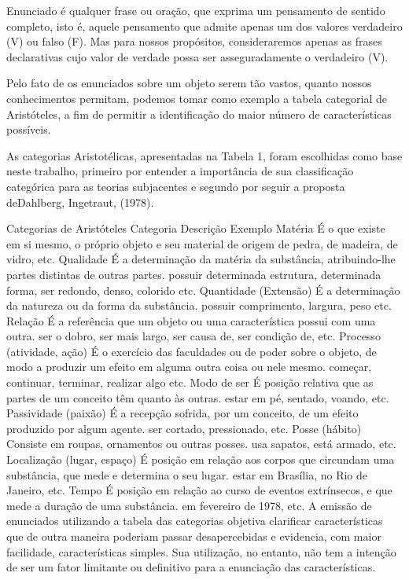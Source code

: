 Enunciado é qualquer frase ou oração, que exprima um pensamento de sentido completo, isto é, aquele pensamento que admite apenas um dos valores verdadeiro (V) ou falso (F). Mas para nossos propósitos, consideraremos apenas as frases declarativas cujo valor de verdade possa ser asseguradamente o verdadeiro (V).

Pelo fato de os enunciados sobre um objeto serem tão vastos, quanto nossos conhecimentos permitam, podemos tomar como exemplo a tabela categorial de Aristóteles, a fim de permitir a identificação do maior número de características possíveis.

As categorias Aristotélicas, apresentadas na Tabela 1, foram escolhidas como base neste trabalho, primeiro por entender a importância de sua classificação categórica para as teorias subjacentes e segundo por seguir a proposta deDahlberg, Ingetraut, (1978).

Categorias de Aristóteles
Categoria	Descrição	Exemplo
Matéria	É o que existe em si mesmo, o próprio objeto e seu material de origem	de pedra, de madeira, de vidro, etc.
Qualidade	É a determinação da matéria da substância, atribuindo-lhe partes distintas de outras partes.	possuir determinada estrutura, determinada forma, ser redondo, denso, colorido etc.
Quantidade (Extensão)	É a determinação da natureza ou da forma da substância.	possuir comprimento, largura, peso etc.
Relação	É a referência que um objeto ou uma característica possui com uma outra.	ser o dobro, ser mais largo, ser causa de, ser condição de, etc.
Processo (atividade, ação)	É o exercício das faculdades ou de poder sobre o objeto, de modo a produzir um efeito em alguma outra coisa ou nele mesmo.	começar, continuar, terminar, realizar algo etc.
Modo de ser	É posição relativa que as partes de um conceito têm quanto às outras.	estar em pé, sentado, voando, etc.
Passividade (paixão)	É a recepção sofrida, por um conceito, de um efeito produzido por algum agente.	ser cortado, pressionado, etc.
Posse (hábito)	Consiste em roupas, ornamentos ou outras posses.	usa sapatos, está armado, etc.
Localização (lugar, espaço)	É posição em relação aos corpos que circundam uma substância, que mede e determina o seu lugar.	estar em Brasília, no Rio de Janeiro, etc.
Tempo	É posição em relação ao curso de eventos extrínsecos, e que mede a duração de uma substância.	em fevereiro de 1978, etc.
A emissão de enunciados utilizando a tabela das categorias objetiva clarificar características que de outra maneira poderiam passar desapercebidas e evidencia, com maior facilidade, características simples. Sua utilização, no entanto, não tem a intenção de ser um fator limitante ou definitivo para a enunciação das características.

